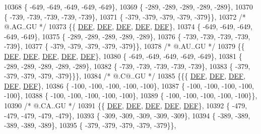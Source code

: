 \begin{DoxyCode}
10368 \{ -649, -649, -649, -649, -649\},
10369 \{ -289, -289, -289, -289, -289\},
10370 \{ -739, -739, -739, -739, -739\},
10371 \{ -379, -379, -379, -379, -379\}\},
10372 \textcolor{comment}{/*  @.AG..GU */}
10373 \{\{  \mbox{\hyperlink{1_88_84__epars_8h_a397419fc12b37ed479c8abb9d444d843}{DEF}},  \mbox{\hyperlink{1_88_84__epars_8h_a397419fc12b37ed479c8abb9d444d843}{DEF}},  \mbox{\hyperlink{1_88_84__epars_8h_a397419fc12b37ed479c8abb9d444d843}{DEF}},  \mbox{\hyperlink{1_88_84__epars_8h_a397419fc12b37ed479c8abb9d444d843}{DEF}},  \mbox{\hyperlink{1_88_84__epars_8h_a397419fc12b37ed479c8abb9d444d843}{DEF}}\},
10374 \{ -649, -649, -649, -649, -649\},
10375 \{ -289, -289, -289, -289, -289\},
10376 \{ -739, -739, -739, -739, -739\},
10377 \{ -379, -379, -379, -379, -379\}\},
10378 \textcolor{comment}{/*  @.AU..GU */}
10379 \{\{  \mbox{\hyperlink{1_88_84__epars_8h_a397419fc12b37ed479c8abb9d444d843}{DEF}},  \mbox{\hyperlink{1_88_84__epars_8h_a397419fc12b37ed479c8abb9d444d843}{DEF}},  \mbox{\hyperlink{1_88_84__epars_8h_a397419fc12b37ed479c8abb9d444d843}{DEF}},  \mbox{\hyperlink{1_88_84__epars_8h_a397419fc12b37ed479c8abb9d444d843}{DEF}},  \mbox{\hyperlink{1_88_84__epars_8h_a397419fc12b37ed479c8abb9d444d843}{DEF}}\},
10380 \{ -649, -649, -649, -649, -649\},
10381 \{ -289, -289, -289, -289, -289\},
10382 \{ -739, -739, -739, -739, -739\},
10383 \{ -379, -379, -379, -379, -379\}\}\},
10384 \textcolor{comment}{/*  @.C@..GU */}
10385 \{\{\{  \mbox{\hyperlink{1_88_84__epars_8h_a397419fc12b37ed479c8abb9d444d843}{DEF}},  \mbox{\hyperlink{1_88_84__epars_8h_a397419fc12b37ed479c8abb9d444d843}{DEF}},  \mbox{\hyperlink{1_88_84__epars_8h_a397419fc12b37ed479c8abb9d444d843}{DEF}},  \mbox{\hyperlink{1_88_84__epars_8h_a397419fc12b37ed479c8abb9d444d843}{DEF}},  \mbox{\hyperlink{1_88_84__epars_8h_a397419fc12b37ed479c8abb9d444d843}{DEF}}\},
10386 \{ -100, -100, -100, -100, -100\},
10387 \{ -100, -100, -100, -100, -100\},
10388 \{ -100, -100, -100, -100, -100\},
10389 \{ -100, -100, -100, -100, -100\}\},
10390 \textcolor{comment}{/*  @.CA..GU */}
10391 \{\{  \mbox{\hyperlink{1_88_84__epars_8h_a397419fc12b37ed479c8abb9d444d843}{DEF}},  \mbox{\hyperlink{1_88_84__epars_8h_a397419fc12b37ed479c8abb9d444d843}{DEF}},  \mbox{\hyperlink{1_88_84__epars_8h_a397419fc12b37ed479c8abb9d444d843}{DEF}},  \mbox{\hyperlink{1_88_84__epars_8h_a397419fc12b37ed479c8abb9d444d843}{DEF}},  \mbox{\hyperlink{1_88_84__epars_8h_a397419fc12b37ed479c8abb9d444d843}{DEF}}\},
10392 \{ -479, -479, -479, -479, -479\},
10393 \{ -309, -309, -309, -309, -309\},
10394 \{ -389, -389, -389, -389, -389\},
10395 \{ -379, -379, -379, -379, -379\}\},

\end{DoxyCode}
